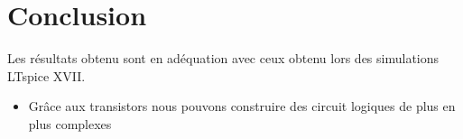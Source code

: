 \documentclass{homeworg}
\begin{document}
\section{Conclusion}
    Les résultats obtenu sont en adéquation avec ceux obtenu lors des simulations LTspice XVII.
    \begin{itemize}
        \item Grâce aux transistors nous pouvons construire des circuit logiques de plus en plus complexes
    \end{itemize}
\end{document}

